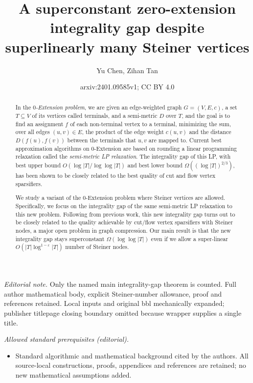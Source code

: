 \documentclass[11pt]{article}
\title{A superconstant zero-extension integrality gap despite superlinearly many Steiner vertices}
\author{Yu Chen, Zihan Tan}
\date{arxiv:2401.09585v1; CC BY 4.0}
\theoremstyle{definition}
\newcounter{note}
\begin{document}
\maketitle
\noindent\textit{Editorial note.} Only the named main integrality-gap theorem is counted. Full author mathematical body, explicit Steiner-number allowance, proof and references retained. Local inputs and original bbl mechanically expanded; publisher titlepage closing boundary omitted because wrapper supplies a single title.\par\medskip
\noindent\textit{Allowed standard prerequisites (editorial).}\begin{itemize}
\item Standard algorithmic and mathematical background cited by the authors. All source-local constructions, proofs, appendices and references are retained; no new mathematical assumptions added.
\end{itemize}\medskip
	\begin{abstract}
		
In the \emph{$0$-Extension problem}, we are given an edge-weighted graph $G=(V,E,c)$, a set $T\subseteq V$ of its vertices called terminals, and a semi-metric $D$ over $T$, and the goal is to find an assignment $f$ of each non-terminal vertex to a terminal, minimizing the sum, over all edges $(u,v)\in E$, the product of the edge weight $c(u,v)$ and the distance $D(f(u),f(v))$ between the terminals that $u,v$ are mapped to.
Current best approximation algorithms on $0$-Extension are based on rounding a linear programming relaxation called the \emph{semi-metric LP relaxation}. The integrality gap of this LP, with best upper bound $O(\log |T|/\log\log |T|)$ and best lower bound $\Omega((\log |T|)^{2/3})$, has been shown to be closely related to the best quality of cut and flow vertex sparsifiers.

We study a variant of the $0$-Extension problem where Steiner vertices are allowed. Specifically, we focus on the integrality gap of the same semi-metric LP relaxation to this new problem. 
Following from previous work, this new integrality gap turns out to be closely related to the quality achievable by cut/flow vertex sparsifiers with Steiner nodes, a major open problem in graph compression. 
Our main result is that the new integrality gap stays superconstant $\Omega(\log\log |T|)$ even if we allow a super-linear $O(|T|\log^{1-\varepsilon}|T|)$ number of Steiner nodes.
		
		
		
		
		
		
		
		
		
	\end{abstract}
\end{document}
